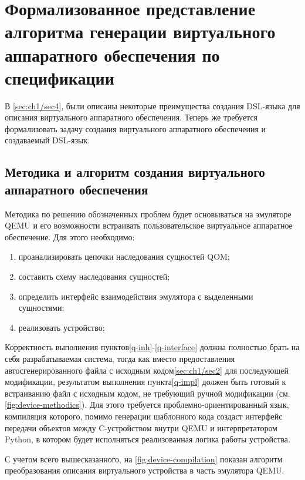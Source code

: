 \chapter{Формализованное представление алгоритма генерации виртуального аппаратного обеспечения по спецификации}\label{ch:ch2}

В \cref{sec:ch1/sec4}, были описаны некоторые преимущества
создания DSL-языка для описания виртуального аппаратного обеспечения.
Теперь же требуется формализовать задачу создания виртуального аппаратного обеспечения и создаваемый DSL-язык.

\section{Методика и алгоритм создания виртуального аппаратного обеспечения}\label{sec:ch2/sec1}

Методика по решению обозначенных проблем будет основываться на эмуляторе QEMU и его
возможности встраивать пользовательское виртуальное аппаратное обеспечение.
Для этого необходимо:

\begin{enumerate}[label={\arabic*)}]
    \item \label{q-inh} проанализировать цепочки наследования сущностей QOM;
    \item \label{q-inh-scheme} составить схему наследования сущностей;
    \item \label{q-interface} определить интерфейс взаимодействия эмулятора с выделенными сущностями;
    \item \label{q-impl} реализовать устройство;
\end{enumerate}

Корректность выполнения пунктов\cref{q-inh}-\cref{q-interface} должна полностью брать на себя разрабатываемая система,
тогда как вместо предоставления автосгенерированного файла с исходным кодом\cref{sec:ch1/sec2} для
последующей модификации, результатом выполнения пункта\cref{q-impl} должен быть готовый к встраиванию
файл с исходным кодом, не требующий ручной модификации (см. \cref{fig:device-methodics}).
Для этого требуется проблемно-ориентированный язык, компиляция которого, помимо генерации шаблонного кода
создаст интерфейс передачи объектов между C-устройством внутри QEMU и интерпретатором Python, в
котором будет исполняться реализованная логика работы устройства.

С учетом всего вышесказанного, на \cref{fig:device-compilation} показан алгоритм преобразования
описания виртуального устройства в часть эмулятора QEMU.

